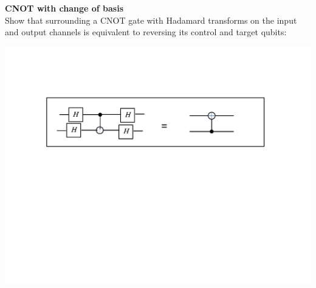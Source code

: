 \documentclass[12pt,letterpaper,boxed,cm]{hmcpset}
\begin{document}
\begin{solution}
    \vfill
\end{solution}
\newpage

\begin{problem}[4] 
    \textbf{CNOT with change of basis}\\
    Show that surrounding a CNOT gate with Hadamard transforms on the input and output channels is equivalent to reversing its control and target qubits:
    \\
    \begin{center}
        \includegraphics[width=400pt]{fig1-4-1.pdf}
    \end{center}
\end{problem}

\begin{solution}
    \vfill
\end{solution}
\end{document}
